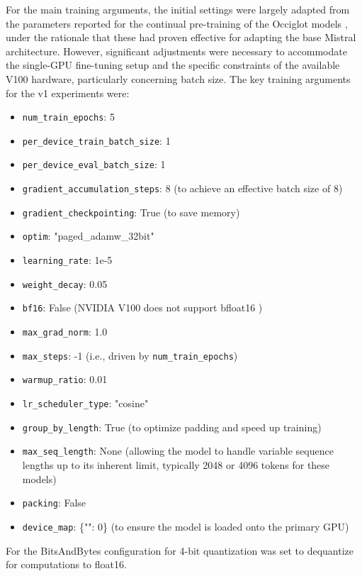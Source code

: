For the main training arguments, the initial settings were largely adapted from the parameters reported for the continual pre-training of the Occiglot models \cite{occiglot2024occiglot7b}, under the rationale that these had proven effective for adapting the base Mistral architecture.
However, significant adjustments were necessary to accommodate the single-GPU fine-tuning setup and the specific constraints of the available V100 hardware, particularly concerning batch size.
The key training arguments for the v1 experiments were:

\begin{itemize}
    \item \texttt{num\_train\_epochs}: 5
    \item \texttt{per\_device\_train\_batch\_size}: 1
    \item \texttt{per\_device\_eval\_batch\_size}: 1
    \item \texttt{gradient\_accumulation\_steps}: 8 (to achieve an effective batch size of 8)
    \item \texttt{gradient\_checkpointing}: True (to save memory)
    \item \texttt{optim}: "paged\_adamw\_32bit"
    \item \texttt{learning\_rate}: 1e-5
    \item \texttt{weight\_decay}: 0.05
    \item \texttt{bf16}: False (NVIDIA V100 does not support bfloat16 \cite{meng2024bfloat16})
    \item \texttt{max\_grad\_norm}: 1.0
    \item \texttt{max\_steps}: -1 (i.e., driven by \texttt{num\_train\_epochs})
    \item \texttt{warmup\_ratio}: 0.01
    \item \texttt{lr\_scheduler\_type}: "cosine"
    \item \texttt{group\_by\_length}: True (to optimize padding and speed up training)
    \item \texttt{max\_seq\_length}: None (allowing the model to handle variable sequence lengths up to its inherent limit, typically 2048 or 4096 tokens for these models)
    \item \texttt{packing}: False
    \item \texttt{device\_map}: \{"": 0\} (to ensure the model is loaded onto the primary GPU)
\end{itemize}

For the BitsAndBytes configuration for 4-bit quantization was set to dequantize for computations to float16.

